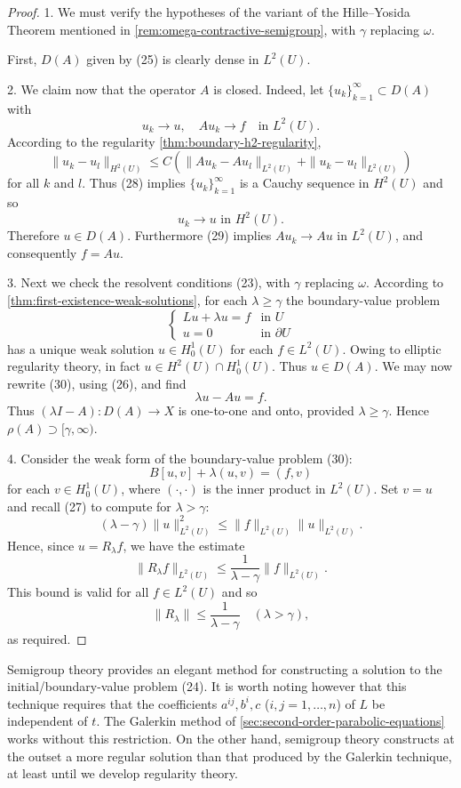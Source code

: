 \begin{proof}
1. We must verify the hypotheses of the variant of the Hille--Yosida Theorem mentioned in \cref{rem:omega-contractive-semigroup}, with $\gamma$ replacing $\omega$.

First, $D(A)$ given by (25) is clearly dense in $L^2(U)$.

2. We claim now that the operator $A$ is closed. Indeed, let $\{u_k\}_{k=1}^\infty \subset D(A)$ with
\[
u_k \to u, \quad Au_k \to f \quad \text{in } L^2(U).
\]
According to the regularity \cref{thm:boundary-h2-regularity},
\[
\|u_k - u_l\|_{H^2(U)} \le C(\|Au_k - Au_l\|_{L^2(U)} + \|u_k - u_l\|_{L^2(U)})
\tag{28}
\]
for all $k$ and $l$. Thus (28) implies $\{u_k\}_{k=1}^\infty$ is a Cauchy sequence in $H^2(U)$ and so
\[
u_k \to u \text{ in } H^2(U).
\tag{29}
\]
Therefore $u \in D(A)$. Furthermore (29) implies $Au_k \to Au$ in $L^2(U)$, and consequently $f = Au$.

3. Next we check the resolvent conditions (23), with $\gamma$ replacing $\omega$. According to \cref{thm:first-existence-weak-solutions}, for each $\lambda \ge \gamma$ the boundary-value problem
\[
\begin{cases} Lu + \lambda u = f & \text{in } U \\ u = 0 & \text{in } \partial U \end{cases}
\tag{30}
\]
has a unique weak solution $u \in H_0^1(U)$ for each $f \in L^2(U)$. Owing to elliptic regularity theory, in fact $u \in H^2(U) \cap H_0^1(U)$. Thus $u \in D(A)$. We may now rewrite (30), using (26), and find
\[
\lambda u - Au = f.
\tag{31}
\]
Thus $(\lambda I - A) : D(A) \to X$ is one-to-one and onto, provided $\lambda \ge \gamma$. Hence $\rho(A) \supset [\gamma,\infty)$.

4. Consider the weak form of the boundary-value problem (30):
\[
B[u,v] + \lambda(u,v) = (f,v)
\]
for each $v \in H_0^1(U)$, where $(\cdot, \cdot)$ is the inner product in $L^2(U)$. Set $v = u$ and recall (27) to compute for $\lambda > \gamma$:
\[
(\lambda - \gamma)\|u\|_{L^2(U)}^2 \le \|f\|_{L^2(U)} \|u\|_{L^2(U)}.
\]
Hence, since $u = R_\lambda f$, we have the estimate
\[
\|R_\lambda f\|_{L^2(U)} \le \frac{1}{\lambda - \gamma} \|f\|_{L^2(U)}.
\]
This bound is valid for all $f \in L^2(U)$ and so
\[
\|R_\lambda\| \le \frac{1}{\lambda - \gamma} \quad (\lambda > \gamma),
\tag{32}
\]
as required.
\end{proof}

\begin{remark}
\label{rem:parabolic-semigroup-remark}
Semigroup theory provides an elegant method for constructing a solution to the initial/boundary-value problem (24). It is worth noting however that this technique requires that the coefficients $a^{ij}, b^i, c$ ($i, j = 1, \ldots, n$) of $L$ be independent of $t$. The Galerkin method of \cref{sec:second-order-parabolic-equations} works without this restriction. On the other hand, semigroup theory constructs at the outset a more regular solution than that produced by the Galerkin technique, at least until we develop regularity theory.
\end{remark}


